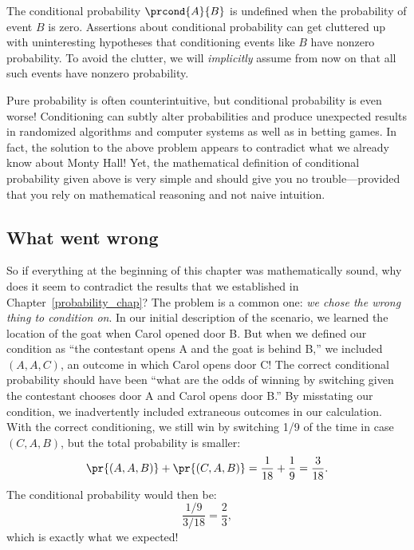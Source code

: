 The conditional probability $\prcond{A}{B}$ is undefined when the
probability of event $B$ is zero.  Assertions about conditional
probability can get cluttered up with uninteresting hypotheses that
conditioning events like $B$ have nonzero probability.  To avoid the
clutter, we will \emph{implicitly} assume from now on that all such
events have nonzero probability.

Pure probability is often counterintuitive, but conditional
probability is even worse!  Conditioning can subtly alter
probabilities and produce unexpected results in randomized algorithms
and computer systems as well as in betting games.  In fact, the
solution to the above problem appears to contradict what we already
know about Monty Hall!  Yet, the mathematical definition of
conditional probability given above is very simple and should give you
no trouble---provided that you rely on mathematical reasoning and not
naive intuition.

\subsection{What went wrong}

So if everything at the beginning of this chapter was mathematically
sound, why does it seem to contradict the results that we established
in Chapter~\ref{probability_chap}?  The problem is a common one:
\emph{we chose the wrong thing to condition on}.  In our initial
description of the scenario, we learned the location of the goat when
Carol opened door B.  But when we defined our condition as ``the
contestant opens A and the goat is behind B,'' we included $(A, A,
C)$, an outcome in which Carol opens door C!  The correct conditional
probability should have been ``what are the odds of winning by
switching given the contestant chooses door A and Carol opens door
B.''  By misstating our condition, we inadvertently included
extraneous outcomes in our calculation.  With the correct
conditioning, we still win by switching 1/9 of the time in case $(C,
A, B)$, but the total probability is smaller:
\[
\pr{(A, A, B)} + \pr{(C, A, B)} = \frac{1}{18} + \frac{1}{9} = \frac{3}{18}.
\]
The conditional probability would then be:
\[
\frac{1/9}{3/18} = \frac{2}{3},
\]
which is exactly what we expected!


